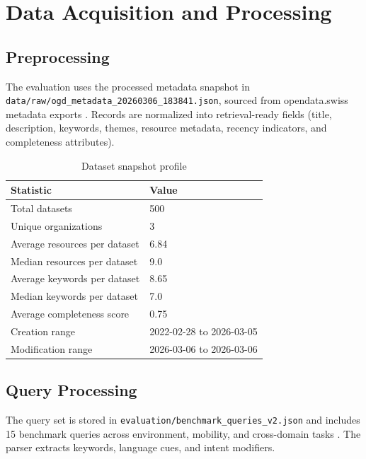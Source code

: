 \documentclass[11pt,a4paper]{article}
\begin{document}
\section{Data Acquisition and Processing}

\subsection{Preprocessing}

The evaluation uses the processed metadata snapshot in \texttt{data/raw/ogd\_metadata\_20260306\_183841.json}, sourced from opendata.swiss metadata exports \citep{opendataswiss2026,ogdSnapshot2026}. Records are normalized into retrieval-ready fields (title, description, keywords, themes, resource metadata, recency indicators, and completeness attributes).

\begin{table}[H]
\centering
\begin{tabular}{p{} p{}}
\toprule
\textbf{Statistic} & \textbf{Value} \\
\midrule
Total datasets & 500 \\
Unique organizations & 3 \\
Average resources per dataset & 6.84 \\
Median resources per dataset & 9.0 \\
Average keywords per dataset & 8.65 \\
Median keywords per dataset & 7.0 \\
Average completeness score & 0.75 \\
Creation range & 2022-02-28 to 2026-03-05 \\
Modification range & 2026-03-06 to 2026-03-06 \\
\bottomrule
\end{tabular}
\caption{Dataset snapshot profile}
\label{tab:snapshot}
\end{table}

\subsection{Query Processing}

The query set is stored in \texttt{evaluation/benchmark\_queries\_v2.json} and includes 15 benchmark queries across environment, mobility, and cross-domain tasks \citep{benchmarkQueries2026}. The parser extracts keywords, language cues, and intent modifiers.
\end{document}
